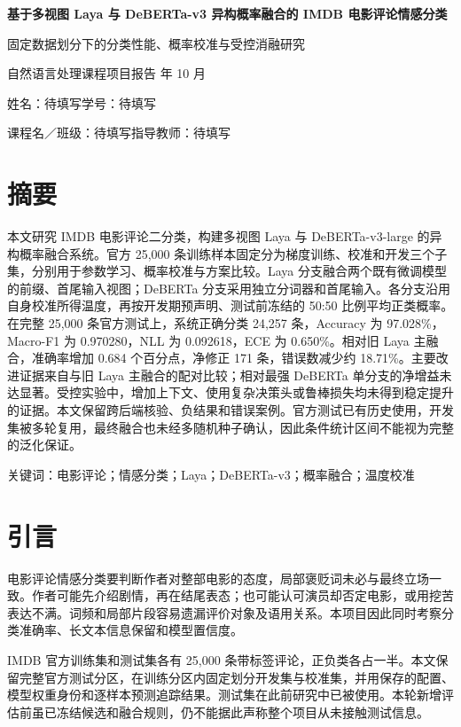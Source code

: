 \documentclass[UTF8,fontset=fandol,a4paper,11pt]{ctexart}
\begin{document}
\begin{center}
{\LARGE\bfseries 基于多视图 Laya 与 DeBERTa-v3 异构概率融合的 IMDB 电影评论情感分类}\par
\vspace{7pt}
{\normalsize 固定数据划分下的分类性能、概率校准与受控消融研究}\par
\vspace{5pt}
{\small 自然语言处理课程项目报告 年 10 月}\par
\vspace{5pt}
{\small 姓名：待填写\qquad 学号：待填写}\par
{\small 课程名／班级：待填写\qquad 指导教师：待填写}
\end{center}
\vspace{4pt}

\section*{摘要}
本文研究 IMDB 电影评论二分类，构建多视图 Laya 与 DeBERTa-v3-large 的异构概率融合系统。官方 25,000 条训练样本固定分为梯度训练、校准和开发三个子集，分别用于参数学习、概率校准与方案比较。Laya 分支融合两个既有微调模型的前缀、首尾输入视图；DeBERTa 分支采用独立分词器和首尾输入。各分支沿用自身校准所得温度，再按开发期预声明、测试前冻结的 50:50 比例平均正类概率。在完整 25,000 条官方测试上，系统正确分类 24,257 条，Accuracy 为 97.028\%，Macro-F1 为 0.970280，NLL 为 0.092618，ECE 为 0.650\%。相对旧 Laya 主融合，准确率增加 0.684 个百分点，净修正 171 条，错误数减少约 18.71\%。主要改进证据来自与旧 Laya 主融合的配对比较；相对最强 DeBERTa 单分支的净增益未达显著。受控实验中，增加上下文、使用复杂决策头或鲁棒损失均未得到稳定提升的证据。本文保留跨后端核验、负结果和错误案例。官方测试已有历史使用，开发集被多轮复用，最终融合也未经多随机种子确认，因此条件统计区间不能视为完整的泛化保证。

关键词：电影评论；情感分类；Laya；DeBERTa-v3；概率融合；温度校准

\section{引言}
电影评论情感分类要判断作者对整部电影的态度，局部褒贬词未必与最终立场一致。作者可能先介绍剧情，再在结尾表态；也可能认可演员却否定电影，或用挖苦表达不满。词频和局部片段容易遗漏评价对象及语用关系。本项目因此同时考察分类准确率、长文本信息保留和模型置信度。

IMDB 官方训练集和测试集各有 25,000 条带标签评论，正负类各占一半\cite{maas}。本文保留完整官方测试分区，在训练分区内固定划分开发集与校准集，并用保存的配置、模型权重身份和逐样本预测追踪结果。测试集在此前研究中已被使用。本轮新增评估前虽已冻结候选和融合规则，仍不能据此声称整个项目从未接触测试信息。
\end{document}
